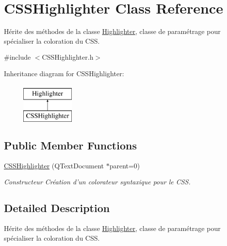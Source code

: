 \hypertarget{class_c_s_s_highlighter}{
\section{CSSHighlighter Class Reference}
\label{class_c_s_s_highlighter}
}


Hérite des méthodes de la classe \hyperlink{class_highlighter}{Highlighter}, classe de paramétrage pour spécialiser la coloration du CSS.  




{\ttfamily \#include $<$CSSHighlighter.h$>$}

Inheritance diagram for CSSHighlighter:\begin{figure}[H]
\begin{center}
\leavevmode
\includegraphics[height=2.000000cm]{class_c_s_s_highlighter}
\end{center}
\end{figure}
\subsection*{Public Member Functions}
\begin{DoxyCompactItemize}
\item 
\hyperlink{class_c_s_s_highlighter_a5e60c589e8ce030cf7a6dbc98bcc1c02}{CSSHighlighter} (QTextDocument $\ast$parent=0)
\begin{DoxyCompactList}\small\item\em Constructeur Création d'un colorateur syntaxique pour le CSS. \item\end{DoxyCompactList}\end{DoxyCompactItemize}


\subsection{Detailed Description}
Hérite des méthodes de la classe \hyperlink{class_highlighter}{Highlighter}, classe de paramétrage pour spécialiser la coloration du CSS. 

